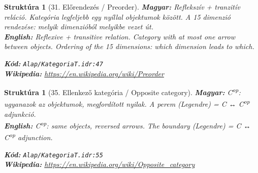 \documentclass[11pt,a4paper,twocolumn]{article}
\newtheorem{struktura}[tetel]{Struktúra}
\begin{document}
\vspace{0.5cm}

\begin{struktura}[31. Előrendezés / Preorder]

\textbf{Magyar:} Reflekszív + tranzitív reláció. Kategória legfeljebb egy nyíllal objektumok között. A 15 dimenzió rendezése: melyik dimenzióból melyikbe vezet út.\\

\textbf{English:} Reflexive + transitive relation. Category with at most one arrow between objects. Ordering of the 15 dimensions: which dimension leads to which.\\

\begin{center}
\end{center}

\textbf{Kód:} \texttt{Alap/KategoriaT.idr:47}\\
\textbf{Wikipedia:} \url{https://en.wikipedia.org/wiki/Preorder}

\end{struktura}

\vspace{0.5cm}

\begin{struktura}[35. Ellenkező kategória / Opposite category]

\textbf{Magyar:} C\textsuperscript{op}: ugyanazok az objektumok, megfordított nyilak. A perem (Legendre) = C ↔ C\textsuperscript{op} adjunkció.\\

\textbf{English:} C\textsuperscript{op}: same objects, reversed arrows. The boundary (Legendre) = C ↔ C\textsuperscript{op} adjunction.\\

\begin{center}
\end{center}

\textbf{Kód:} \texttt{Alap/KategoriaT.idr:55}\\
\textbf{Wikipedia:} \url{https://en.wikipedia.org/wiki/Opposite_category}

\end{struktura}
\end{document}
